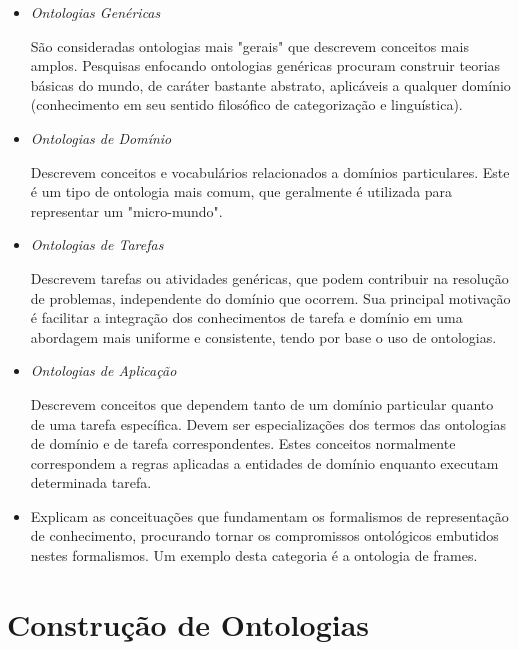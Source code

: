 \begin{itemize}
    \item \textit{Ontologias Genéricas}
    
    São consideradas ontologias mais "gerais" que descrevem conceitos mais 
    amplos. Pesquisas enfocando ontologias genéricas procuram construir teorias
    básicas do mundo, de caráter bastante abstrato, aplicáveis a qualquer domínio
    (conhecimento em seu sentido filosófico de categorização e linguística).
    
    \item \textit{Ontologias de Domínio}
    
    Descrevem conceitos e vocabulários relacionados a domínios particulares. Este
    é um tipo de ontologia mais comum, que geralmente é utilizada para representar
    um "micro-mundo".
    
    \item \textit{Ontologias de Tarefas}
    
    Descrevem tarefas ou atividades genéricas, que podem contribuir na resolução
    de problemas, independente do domínio que ocorrem. Sua principal motivação 
    é facilitar a integração dos conhecimentos de tarefa e domínio em uma 
    abordagem mais uniforme e consistente, tendo por base o uso de ontologias.
    
    \item \textit{Ontologias de Aplicação}
    
    Descrevem conceitos que dependem tanto de um domínio particular quanto de uma
    tarefa específica. Devem ser especializações dos termos das ontologias de 
    domínio e de tarefa correspondentes. Estes conceitos normalmente correspondem
    a regras aplicadas a entidades de domínio enquanto executam determinada tarefa.
    
    \item {}
    
    Explicam as conceituações que fundamentam os formalismos de representação de 
    conhecimento, procurando tornar os compromissos ontológicos embutidos nestes
    formalismos. Um exemplo desta categoria é a ontologia de frames.

\end{itemize}

\section{Construção de Ontologias}
\label{sec:construção_de_ontologias}

